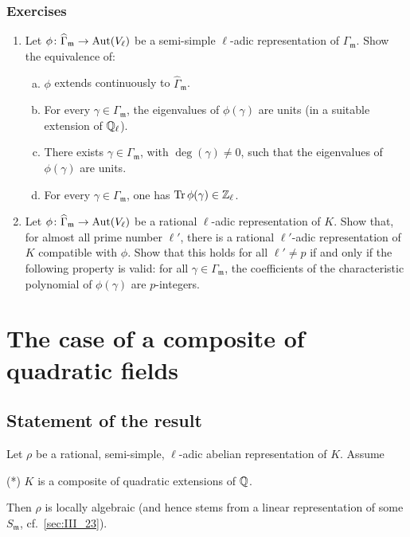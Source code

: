 \subsubsection*{Exercises}
\begin{enumerate}[1)]
\item Let $\phi\colon \widehat{\Gamma}_{\mathfrak{m}} \to \operatorname{Aut}(V_\ell)$ be a
	semi-simple $\ell$-adic representation of $\Gamma_{\mathfrak{m}}$. Show
	the equivalence of:
	\begin{enumerate}[(a)]
	\item $\phi$ extends continuously to $\widehat{\Gamma}_{\mathfrak{m}}$.
	\item For every $\gamma \in \Gamma_{\mathfrak{m}}$, the eigenvalues of
		$\phi(\gamma)$ are units (in a suitable extension of
		$\mathbb{Q}_\ell$).
	\item There exists $\gamma \in \Gamma_{\mathfrak{m}}$, with
		$\deg(\gamma) \ne 0$, such that the eigenvalues of
		$\phi(\gamma)$ are units.
	\item For every $\gamma \in \Gamma_{\mathfrak{m}}$, one has
		$\operatorname{Tr}\phi(\gamma) \in \mathbb{Z}_\ell$.
	\end{enumerate}

\item Let $\phi\colon \widehat{\Gamma}_{\mathfrak{m}} \to \operatorname{Aut}(V_\ell)$ be a
	rational $\ell$-adic representation of $K$.  Show that, for almost all
	prime number $\ell'$, there is a rational $\ell'$-adic representation
	of $K$ compatible with $\phi$. Show that this holds for all $\ell' \ne
	p$ if and only if the following property is valid: for all $\gamma \in
	\Gamma_{\mathfrak{m}}$, the coefficients of the characteristic
	polynomial of $\phi(\gamma)$ are $p$-integers.
\end{enumerate}

\section{The case of a composite of quadratic fields}
\label{sec:III_3}
\dpage

\subsection{Statement of the result}
\label{sec:III_31}

\begin{thm}
Let $\rho$ be a rational, semi-simple, $\ell$-adic abelian representation of
$K$. Assume

\begin{center}
	\textnormal{(*)} $K$ is a composite of quadratic extensions of $\mathbb{Q}$.
\end{center}

Then $\rho$ is locally algebraic (and hence stems from a linear representation
of some $S_\mathfrak{m}$, cf.\ \ref{sec:III_23}).
\end{thm}

